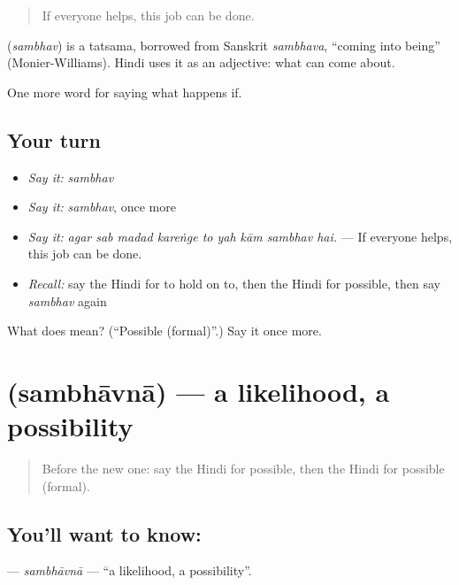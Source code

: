 \begin{quote}
If everyone helps, this job can be done.
\end{quote}

\begin{cousinweb}
\textbf{} (\emph{sambhav}) is a tatsama, borrowed from Sanskrit \emph{sambhava}, \textquotedblleft{}coming into being\textquotedblright{} (Monier-Williams). Hindi uses it as an adjective: what can come about.
\end{cousinweb}

\begin{grammarlens}[title={What you've built}]
One more word for saying what happens if.
\end{grammarlens}

\subsection*{Your turn}
\begin{itemize}
\raggedright
  \item \emph{Say it:} \emph{sambhav}
  \item \emph{Say it:} \emph{sambhav}, once more
  \item \emph{Say it:} \emph{agar sab madad kareṅge to yah kām sambhav hai.} — If everyone helps, this job can be done.
  \item \emph{Recall:} say the Hindi for to hold on to, then the Hindi for possible, then say \emph{sambhav} again
\end{itemize}

\begin{tcolorbox}[breakable,colback=teal!4,colframe=teal!35!black,title={Before you move on}]
What does  mean? (\textquotedblleft{}Possible (formal)\textquotedblright{}.) Say it once more.
\end{tcolorbox}
\section[\texorpdfstring{\hi{संभावना} (sambhāvnā)}{संभावना (sambhāvnā)}]{ (sambhāvnā) — a likelihood, a possibility}

\label{lesson:HI-C373-sambhavna}



\begin{quote}
Before the new one: say the Hindi for possible, then the Hindi for possible (formal).
\end{quote}

\subsection*{You'll want to know: }
\textbf{} — \emph{sambhāvnā} — \textquotedblleft{}a likelihood, a possibility\textquotedblright{}.

